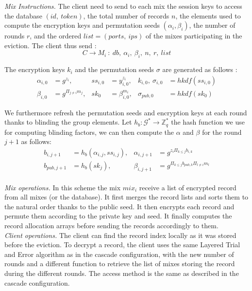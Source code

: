 \documentclass{llncs}
\begin{document}
\noindent\textit{Mix Instructions.}
The client need to send to each mix the session keys to access the database $(id,\ token)$, the total number of records $n$, the elements used to compute the encryption keys and permutation seeds $(\alpha_i, \beta_i)$, the number of rounds $r$, and the ordered $list=(ports,\ ips)$ of the mixes participating in the eviction. The client thus send :
$$C \rightarrow M_i\ :\ db,\ \alpha_i,\ \beta_{i},\ n,\ r,\ list$$

\noindent The encryption keys $k_i$ and the permutation seeds $\sigma$ are generated as follows :
\begin{align*}
\alpha_{i,0} &= g^{z_i}, &ss_{i,0 }&= y_{i,0}^{z_i}, &k_{i,0},\ \sigma_{i,0}&=hkdf(ss_{i,0})\\
\beta_{i, 0} &= g^{\Pi_{j\neq i}m_j}, &sk_0 &= \beta_{i,0}^{m_i}, &\sigma_{pub, 0}&=hkdf( sk_0)
\end{align*}

We furthermore refresh the permutation seeds and encryption keys at each round thanks to blinding the group elements. Let $h_b : \mathcal{G}^* \rightarrow \mathbb{Z}_{q}^*$ the hash function we use for computing blinding factors, we can then compute the $\alpha$ and $\beta$ for the round $j+1$ as follows:
\begin{align*}
b_{i,j+1}&=h_b(\alpha_{i,j}, ss_{i,j}), & \alpha_{i,j+1} &= g^{z_i\Pi_{k\leq j}b_{i,k}}\\
b_{pub,j+1}&=h_b(sk_{j}), &\beta_{i, j+1} &= g^{\Pi_{k\leq j}b_{pub,k}\Pi_{l\neq i}m_l}\\
\end{align*}

\vspace{-1em}

\noindent\textit{Mix operations.} In this scheme the mix $mix_i$ receive a list of encrypted record from all mixes (or the database). It first merges the record lists and  sorts them to the natural order thanks to the public seed. It then encrypts each record and permute them according to the private key and seed. It finally computes the record allocation arrays before sending the records accordingly to them.\\

\noindent\textit{Client operations.} The client can find the record index locally as it was stored before the eviction. To decrypt a record, the client uses the same Layered Trial and Error algorithm as in the cascade configuration, with the new number of rounds and a different function to retrieve the list of mixes storing the record during the different rounds.
The access method is the same as described in the cascade configuration. \\
\end{document}
